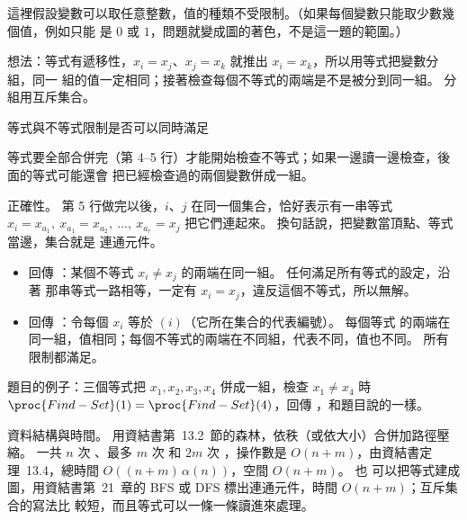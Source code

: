 \begin{pastsoln}
這裡假設變數可以取任意整數，值的種類不受限制。（如果每個變數只能取少數幾個值，例如只能
是 $0$ 或 $1$，問題就變成圖的著色，不是這一題的範圍。）

想法：等式有遞移性，$x_i = x_j$、$x_j = x_k$ 就推出 $x_i = x_k$，所以用等式把變數分組，同一
組的值一定相同；接著檢查每個不等式的兩端是不是被分到同一組。 分組用互斥集合。

\begin{pseudo}[unbreakable]{等式與不等式限制是否可以同時滿足}
        \State {}
    \EndFor
        \State {}
    \EndFor
            \State \Return \FALSE
        \EndIf
    \EndFor
    \State \Return \TRUE
\EndFunction
\end{pseudo}

等式要全部合併完（第 4--5 行）才能開始檢查不等式；如果一邊讀一邊檢查，後面的等式可能還會
把已經檢查過的兩個變數併成一組。

正確性。 第 5 行做完以後，$i$、$j$ 在同一個集合，恰好表示有一串等式
$x_i = x_{a_1},\ x_{a_1} = x_{a_2},\ \ldots,\ x_{a_r} = x_j$ 把它們連起來。 換句話說，把變數當頂點、等式當邊，集合就是
連通元件。
\begin{itemize}
\item 回傳 \FALSE：某個不等式 $x_i \ne x_j$ 的兩端在同一組。 任何滿足所有等式的設定，沿著
那串等式一路相等，一定有 $x_i = x_j$，違反這個不等式，所以無解。
\item 回傳 \TRUE：令每個 $x_i$ 等於 $(i)$（它所在集合的代表編號）。 每個等式
的兩端在同一組，值相同；每個不等式的兩端在不同組，代表不同，值也不同。 所有限制都滿足。
\end{itemize}
題目的例子：三個等式把 $x_1, x_2, x_3, x_4$ 併成一組，檢查 $x_1 \ne x_4$ 時
$\proc{Find-Set}(1) = \proc{Find-Set}(4)$，回傳 \FALSE，和題目說的一樣。

資料結構與時間。 用資結書第~13.2~節的森林，依秩（或依大小）合併加路徑壓縮。 一共
$n$ 次 、最多 $m$ 次  和 $2m$ 次 ，操作數是
$O(n + m)$，由資結書定理~13.4，總時間 $O((n + m)\,\alpha(n))$，空間 $O(n + m)$。 也
可以把等式建成圖，用資結書第~21~章的 BFS 或 DFS 標出連通元件，時間 $O(n + m)$；互斥集合的寫法比
較短，而且等式可以一條一條讀進來處理。
\end{pastsoln}
